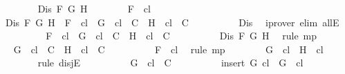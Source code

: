 \begin{isabellebody}
\ \ \ \ \ \ \isamarkupfalse%
\ {\isachardoublequoteopen}Dis\ F\ G\ H{\isachardoublequoteclose}\isanewline
\ \ \ \ \ \ \isamarkupfalse%
\ {\isachardoublequoteopen}F\ {\isasymin}\ {\isacharquery}cl{\isachardoublequoteclose}\isanewline
\ \ \ \ \ \ \isamarkupfalse%
\ {\isachardoublequoteopen}Dis\ F\ G\ H\ {\isasymlongrightarrow}\ F\ {\isasymin}\ {\isacharquery}cl\ {\isasymlongrightarrow}\ {\isacharbraceleft}G{\isacharbraceright}\ {\isasymunion}\ {\isacharquery}cl\ {\isasymin}\ C\ {\isasymor}\ {\isacharbraceleft}H{\isacharbraceright}\ {\isasymunion}\ {\isacharquery}cl\ {\isasymin}\ C{\isachardoublequoteclose}\isanewline
\ \ \ \ \ \ \ \ \isamarkupfalse%
\ Dis\ \isamarkupfalse%
\ {\isacharparenleft}iprover\ elim{\isacharcolon}\ allE{\isacharparenright}\isanewline
\ \ \ \ \ \ \isamarkupfalse%
\ \isamarkupfalse%
\ {\isachardoublequoteopen}F\ {\isasymin}\ {\isacharquery}cl\ {\isasymlongrightarrow}\ {\isacharbraceleft}G{\isacharbraceright}\ {\isasymunion}\ {\isacharquery}cl\ {\isasymin}\ C\ {\isasymor}\ {\isacharbraceleft}H{\isacharbraceright}\ {\isasymunion}\ {\isacharquery}cl\ {\isasymin}\ C{\isachardoublequoteclose}\isanewline
\ \ \ \ \ \ \ \ \isamarkupfalse%
\ {\isacartoucheopen}Dis\ F\ G\ H{\isacartoucheclose}\ \isamarkupfalse%
\ {\isacharparenleft}rule\ mp{\isacharparenright}\isanewline
\ \ \ \ \ \ \isamarkupfalse%
\ \isamarkupfalse%
\ {\isachardoublequoteopen}{\isacharbraceleft}G{\isacharbraceright}\ {\isasymunion}\ {\isacharquery}cl\ {\isasymin}\ C\ {\isasymor}\ {\isacharbraceleft}H{\isacharbraceright}\ {\isasymunion}\ {\isacharquery}cl\ {\isasymin}\ C{\isachardoublequoteclose}\isanewline
\ \ \ \ \ \ \ \ \isamarkupfalse%
\ {\isacartoucheopen}F\ {\isasymin}\ {\isacharquery}cl{\isacartoucheclose}\ \isamarkupfalse%
\ {\isacharparenleft}rule\ mp{\isacharparenright}\isanewline
\ \ \ \ \ \ \isamarkupfalse%
\ {\isachardoublequoteopen}G\ {\isasymin}\ {\isacharquery}cl\ {\isasymor}\ H\ {\isasymin}\ {\isacharquery}cl{\isachardoublequoteclose}\isanewline
\ \ \ \ \ \ \isamarkupfalse%
\ {\isacharparenleft}rule\ disjE{\isacharparenright}\isanewline
\ \ \ \ \ \ \ \ \isamarkupfalse%
\ {\isachardoublequoteopen}{\isacharbraceleft}G{\isacharbraceright}\ {\isasymunion}\ {\isacharquery}cl\ {\isasymin}\ C{\isachardoublequoteclose}\isanewline
\ \ \ \ \ \ \ \ \isamarkupfalse%
\ {\isachardoublequoteopen}insert\ G\ {\isacharquery}cl\ {\isacharequal}\ {\isacharbraceleft}G{\isacharbraceright}\ {\isasymunion}\ {\isacharquery}cl{\isachardoublequoteclose}\isanewline

\end{isabellebody}
